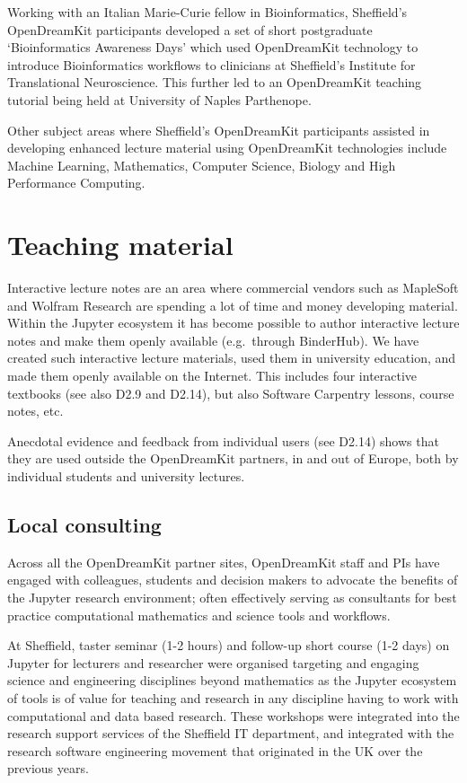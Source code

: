 \documentclass{deliverablereport}
\begin{document}
\begin{itemize}
  Working with an Italian Marie-Curie fellow in Bioinformatics,
  Sheffield's OpenDreamKit participants developed a set of short
  postgraduate `Bioinformatics Awareness Days' which used OpenDreamKit
  technology to introduce Bioinformatics workflows to clinicians at
  Sheffield's Institute for Translational Neuroscience. This further led
  to an OpenDreamKit teaching tutorial being held at University of
  Naples Parthenope.

  Other subject areas where Sheffield's OpenDreamKit participants
  assisted in developing enhanced lecture material using OpenDreamKit
  technologies include Machine Learning, Mathematics, Computer Science,
  Biology and High Performance Computing.
\end{itemize}

\section{Teaching material}

Interactive lecture notes are an area where commercial vendors such as
MapleSoft and Wolfram Research are spending a lot of time and money
developing material. Within the Jupyter ecosystem it has become possible
to author interactive lecture notes and make them openly available
(e.g.~through BinderHub). We have created such interactive lecture
materials, used them in university education, and made them openly
available on the Internet. This includes four interactive textbooks (see
also D2.9 and D2.14), but also Software Carpentry lessons, course notes,
etc.

Anecdotal evidence and feedback from individual users (see D2.14) shows
that they are used outside the OpenDreamKit partners, in and out of
Europe, both by individual students and university lectures.

\subsection{Local consulting}

Across all the OpenDreamKit partner sites, OpenDreamKit staff and PIs
have engaged with colleagues, students and decision makers to advocate
the benefits of the Jupyter research environment; often effectively
serving as consultants for best practice computational mathematics and
science tools and workflows.

At Sheffield, taster seminar (1-2 hours) and follow-up short course (1-2
days) on Jupyter for lecturers and researcher were organised targeting
and engaging science and engineering disciplines beyond mathematics as
the Jupyter ecosystem of tools is of value for teaching and research in
any discipline having to work with computational and data based
research. These workshops were integrated into the research support
services of the Sheffield IT department, and integrated with the
research software engineering movement that originated in the UK over
the previous years.
\end{document}
